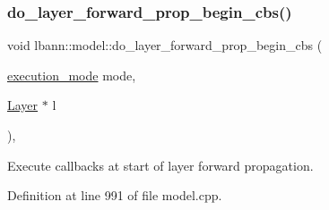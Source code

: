 \subsubsection{\texorpdfstring{do\+\_\+layer\+\_\+forward\+\_\+prop\+\_\+begin\+\_\+cbs()}{do\_layer\_forward\_prop\_begin\_cbs()}}
{\footnotesize\ttfamily void lbann\+::model\+::do\+\_\+layer\+\_\+forward\+\_\+prop\+\_\+begin\+\_\+cbs (\begin{DoxyParamCaption}\item[{\hyperlink{base_8hpp_a2781a159088df64ed7d47cc91c4dc0a8}{execution\+\_\+mode}}]{mode,  }\item[{\hyperlink{classlbann_1_1Layer}{Layer} $\ast$}]{l }\end{DoxyParamCaption})\hspace{0.3cm}{\ttfamily [protected]}, {\ttfamily [virtual]}}

Execute callbacks at start of layer forward propagation. 

Definition at line 991 of file model.\+cpp.


